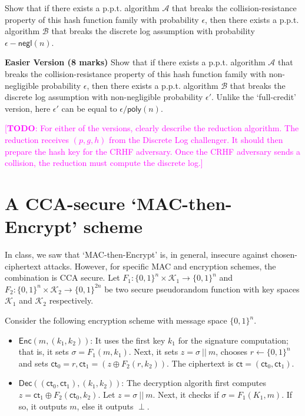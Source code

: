 \documentclass[10pt,addpoints]{exam}
\newcommand{\calA}{\mathcal{A}}
\newcommand{\calB}{\mathcal{B}}
\newcommand{\calK}{\mathcal{K}}
\newcommand{\enc}{\mathsf{Enc}}
\newcommand{\dec}{\mathsf{Dec}}
\newcommand{\negl}{\mathsf{negl}}
\newcommand{\poly}{\mathsf{poly}}
\newcommand{\ct}{\mathsf{ct}}
\newcommand{\TODO}[1]{\textcolor{magenta}{[\textbf{TODO}: #1]}}
\theoremstyle{definition}
\begin{document}
    Show that if there exists a p.p.t. algorithm $\calA$ that breaks the collision-resistance property of this hash function family with probability $\epsilon$, then there exists a p.p.t. algorithm $\calB$ that breaks the discrete log assumption with probability $\epsilon - \negl(n)$. 


    \vspace{10pt}

    \textbf{Easier Version (8 marks)} Show that if there exists a p.p.t. algorithm $\calA$ that breaks the collision-resistance property of this hash function family with non-negligible probability $\epsilon$, then there exists a p.p.t. algorithm $\calB$ that breaks the discrete log assumption with non-negligible probability $\epsilon'$. Unlike the `full-credit' version, here $\epsilon'$ can be equal to $\epsilon/\poly(n)$. 

    \color{black}

    \vspace{10pt}

    \noindent\TODO{For either of the versions, clearly describe the reduction algorithm. The reduction receives $(p, g, h)$ from the Discrete Log challenger. It should then prepare the hash key for the CRHF adversary. Once the CRHF adversary sends a collision, the reduction must compute the discrete log.}


    \color{blue}

    \newpage
    \section{A CCA-secure `MAC-then-Encrypt' scheme}

        In class, we saw that `MAC-then-Encrypt' is, in general, insecure against chosen-ciphertext attacks. However, for specific MAC and encryption schemes, the combination is CCA secure. Let $F_1 : \{0,1\}^{n} \times \calK_1 \to \{0,1\}^{n}$ and $F_2 : \{0,1\}^{n} \times \calK_2 \to \{0,1\}^{2n}$ be two secure pseudorandom function with key spaces  $\calK_1$ and $\calK_2$ respectively. 

        Consider the following encryption scheme with message space $\{0,1\}^n$.

        \begin{itemize}
            \item $\enc(m, (k_1, k_2))$: It uses the first key $k_1$ for the signature computation; that is, it sets $\sigma = F_1(m, k_1)$. Next, it sets $z = \sigma ~||~ m$, chooses $r \gets \{0,1\}^{n}$ and sets $\ct_0 = r, \ct_1 = (z \oplus F_2(r, k_2))$. The ciphertext is $\ct = (\ct_0, \ct_1)$. 

            \item $\dec((\ct_0, \ct_1), (k_1, k_2))$: The decryption algorith first computes $z = \ct_1 \oplus F_2(\ct_0, k_2)$. Let $z = \sigma ~||~ m$. Next, it checks if $\sigma = F_1(K_1, m)$. If so, it outputs $m$, else it outputs $\perp$. 

        \end{itemize}
\end{document}
